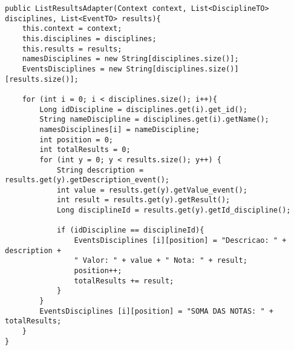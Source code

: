 \begin{lstlisting}[style=custom_JAVA]
public ListResultsAdapter(Context context, List<DisciplineTO> disciplines, List<EventTO> results){
    this.context = context;
    this.disciplines = disciplines;
    this.results = results;
    namesDisciplines = new String[disciplines.size()];
    EventsDisciplines = new String[disciplines.size()][results.size()];

    for (int i = 0; i < disciplines.size(); i++){
        Long idDiscipline = disciplines.get(i).get_id();
        String nameDiscipline = disciplines.get(i).getName();
        namesDisciplines[i] = nameDiscipline;
        int position = 0;
        int totalResults = 0;
        for (int y = 0; y < results.size(); y++) {
            String description = results.get(y).getDescription_event();
            int value = results.get(y).getValue_event();
            int result = results.get(y).getResult();
            Long disciplineId = results.get(y).getId_discipline();

            if (idDiscipline == disciplineId){
                EventsDisciplines [i][position] = "Descricao: " + description +
                " Valor: " + value + " Nota: " + result;
                position++;
                totalResults += result;
            }
        }
        EventsDisciplines [i][position] = "SOMA DAS NOTAS: " + totalResults;
    }
}
\end{lstlisting}
